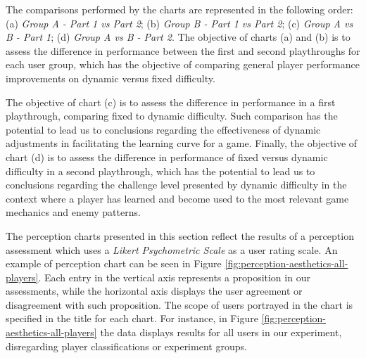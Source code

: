 The comparisons performed by the charts are represented in the following order: (a) \emph{Group A - Part 1 vs Part 2}; (b) \emph{Group B - Part 1 vs Part 2}; (c) \emph{Group A vs B - Part 1}; (d) \emph{Group A vs B - Part 2}. The objective of charts (a) and (b) is to assess the difference in performance between the first and second playthroughs for each user group, which has the objective of comparing general player performance improvements on dynamic versus fixed difficulty.

The objective of chart (c) is to assess the difference in performance in a first playthrough, comparing fixed to dynamic difficulty. Such comparison has the potential to lead us to conclusions regarding the effectiveness of dynamic adjustments in facilitating the learning curve for a game. Finally, the objective of chart (d) is to assess the difference in performance of fixed versus dynamic difficulty in a second playthrough, which has the potential to lead us to conclusions regarding the challenge level presented by dynamic difficulty in the context where a player has learned and become used to the most relevant game mechanics and enemy patterns.


The perception charts presented in this section reflect the results of a perception assessment which uses a \emph{Likert Psychometric Scale} as a user rating scale. An example of perception chart can be seen in Figure \ref{fig:perception-aesthetics-all-players}. Each entry in the vertical axis represents a proposition in our assessments, while the horizontal axis displays the user agreement or disagreement with such proposition. The scope of users portrayed in the chart is specified in the title for each chart. For instance, in Figure \ref{fig:perception-aesthetics-all-players} the data displays results for all users in our experiment, disregarding player classifications or experiment groups.


